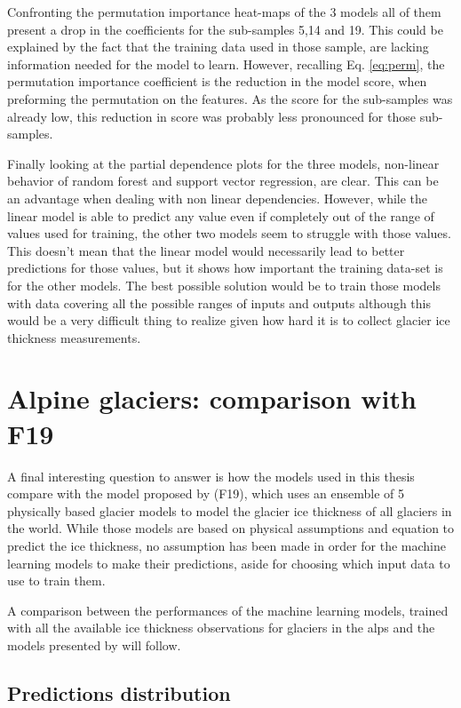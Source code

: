 Confronting the permutation importance heat-maps of the 3 models all of them present a drop in the coefficients for the sub-samples 5,14 and 19. This could be explained by the fact that the training data used in those sample, are lacking information needed for the model to learn. However, recalling Eq. \ref{eq:perm}, the permutation importance coefficient is the reduction in the model score, when preforming the permutation on the features. As the score for the sub-samples was already low, this reduction in score was probably less pronounced for those sub-samples. 

Finally looking at the partial dependence plots for the three models, non-linear behavior of random forest and support vector regression, are clear. This can be an advantage when dealing with non linear dependencies. However, while the linear model is able to predict any value even if completely out of the range of values used for training, the other two models seem to struggle with those values. This doesn't mean that the linear model would necessarily lead to better predictions for those values, but it shows how important the training data-set is for the other models. The best possible solution would be to train those models with data covering all the possible ranges of inputs and outputs although this would be a very difficult thing to realize given how hard it is to collect glacier ice thickness measurements.

\section{Alpine glaciers: comparison with F19}\label{disc-alps}

A final interesting question to answer is how the models used in this thesis compare with the model proposed by \citet{Farinotti2019} (F19), which uses an ensemble of 5 physically based glacier models to model the glacier ice thickness of all glaciers in the world. While those models are based on physical assumptions and  equation to predict the ice thickness, no assumption has been made in order for the machine learning models to make their predictions, aside for choosing which input data to use to train them. 

A comparison between the performances of the machine learning models, trained with all the available ice thickness observations for glaciers in the alps and the models presented by \citet{Farinotti2019} will follow.

\subsection{Predictions distribution}\label{disc-distr} 

